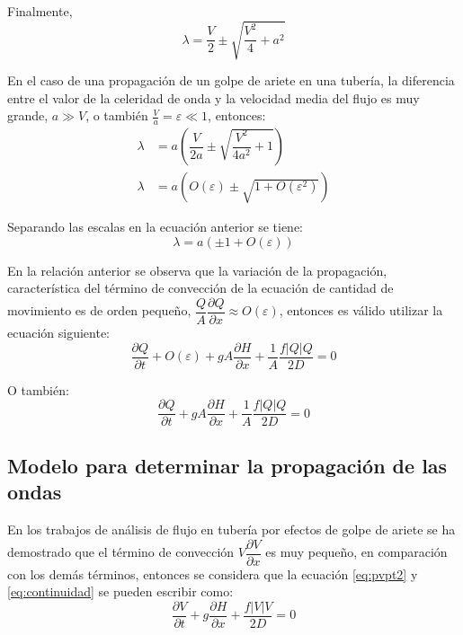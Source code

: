 \documentclass[letterpaper]{report}
\begin{document}
\begin{mdframed}[backgroundcolor=verdeclaro]
Finalmente,
\begin{equation*}
	\lambda=\dfrac{V}{2}\pm\sqrt{\dfrac{V^2}{4}+a^2}
\end{equation*}

En el caso de una propagación de un golpe de ariete en una tubería, la diferencia entre el valor de la celeridad de onda y la velocidad media del flujo es muy grande, $a\gg V$, o también $\frac{V}{a}=\varepsilon\ll1$, entonces:\\
\begin{equation*}
	\begin{aligned}
	\lambda &=a\left(\dfrac{V}{2a}\pm\sqrt{\dfrac{V^2}{4a^2}+1}\right) \\
	\lambda &=a\left(O\left(\varepsilon\right)\pm\sqrt{1+O\left(\varepsilon^2\right)}\right)
	\end{aligned}
\end{equation*}

Separando las escalas en la ecuación anterior se tiene:
\begin{equation*}
	\lambda=a(\pm1+O(\varepsilon))
\end{equation*}

En la relación anterior se observa que la variación de la propagación, característica del término de convección de la ecuación de cantidad de movimiento es de orden pequeño, $\dfrac{Q}{A}\dfrac{\partial Q}{\partial x}\approx O(\varepsilon)$, entonces es válido utilizar la ecuación siguiente:
\begin{equation*}
	\dfrac{\partial Q}{\partial t}+O(\varepsilon)+gA\dfrac{\partial H}{\partial x}+\dfrac{1}{A}\dfrac{f\left|Q\right|Q}{2D}=0
\end{equation*}

O también:
\begin{equation*}
	\frac{\partial Q}{\partial t}+gA\frac{\partial H}{\partial x}+\frac{1}{A}\frac{f\left|Q\right|Q}{2D}=0
\end{equation*}
\end{mdframed}

\subsection{Modelo para determinar la propagación de las ondas}
En los trabajos de análisis de flujo en tubería por efectos de golpe de ariete se ha demostrado que el término de convección $V\dfrac{\partial V}{\partial x}$ es muy pequeño, en comparación con los demás términos, entonces se considera que la ecuación \ref{eq:pvpt2} y \ref{eq:continuidad} se pueden escribir como:
\begin{equation}
	\frac{\partial V}{\partial t}+g\frac{\partial H}{\partial x}+\frac{f\left|V\right|V}{2D}=0
\end{equation}
\end{document}
